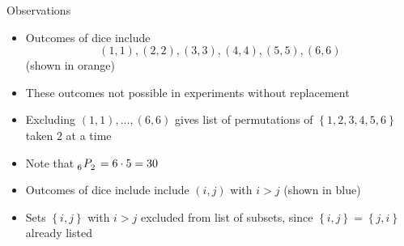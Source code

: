 \documentclass[handout]{beamer}
\theoremstyle{definition}
\newcommand\npr[2]{\tensor[_{#1}]P{_{#2}}}
\begin{document}
\begin{frame}{Observations}
\begin{itemize}
\item Outcomes of dice include
\[\left(1,1\right),\left(2,2\right),\left(3,3\right),
\left(4,4\right),\left(5,5\right),\left(6,6\right)\]
(shown in {\color{orange}orange})
\item These outcomes not possible in experiments without replacement
\item Excluding $\left(1,1\right),\ldots,\left(6,6\right)$
gives list of permutations of $\left\{1,2,3,4,5,6\right\}$
taken $2$ at a time
\item Note that $\npr{6}{2}=6\cdot 5=30$
\item Outcomes of dice include include $\left(i,j\right)$ with $i>j$
(shown in {\color{blue}blue})
\item Sets $\left\{i,j\right\}$ with $i>j$ excluded
from list of subsets, since
$\left\{i,j\right\}=\left\{j,i\right\}$ already listed
\end{itemize}
\end{frame}
\end{document}
